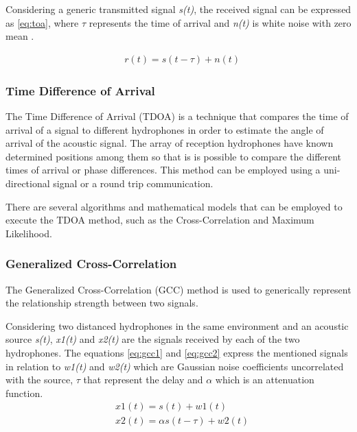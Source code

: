 Considering a generic transmitted signal \textit{s(t)}, the received signal can be expressed as \ref{eq:toa}, where $\tau$ represents the time of arrival and \textit{n(t)} is white noise with zero mean \cite{wirelesscomm}. 

\begin{eqnarray}
& r(t) = s(t - \tau) + n(t)
\label{eq:toa}
\end{eqnarray}

\subsubsection{Time Difference of Arrival}

The Time Difference of Arrival (TDOA) is a technique that compares the time of arrival of a signal to different hydrophones in order to estimate the angle of arrival of the acoustic signal. The array of reception hydrophones have known determined positions among them so that is is possible to compare the different times of arrival or phase differences. This method can be employed using a uni-directional signal or a round trip communication.

There are several algorithms and mathematical models that can be employed to execute the TDOA method, such as the Cross-Correlation and Maximum Likelihood.

\subsubsection{Generalized Cross-Correlation}

The Generalized Cross-Correlation (GCC) method is used to generically represent the relationship strength between two signals.

Considering two distanced hydrophones in the same environment and an acoustic source \textit{s(t)}, \textit{x1(t)} and \textit{x2(t)} are the signals received by each of the two hydrophones. The equations \ref{eq:gcc1} and \ref{eq:gcc2} \cite{crosscorr} express the mentioned signals in relation to \textit{w1(t)} and \textit{w2(t)} which are Gaussian noise coefficients uncorrelated with the source, $\tau$ that represent the delay and $\alpha$ which is an attenuation function.
\begin{eqnarray}
&x1(t) = s(t) + w1(t)
\label{eq:gcc1}\\
&x2(t) = \alpha s(t - \tau) + w2(t)
\label{eq:gcc2}\\
\end{eqnarray}


